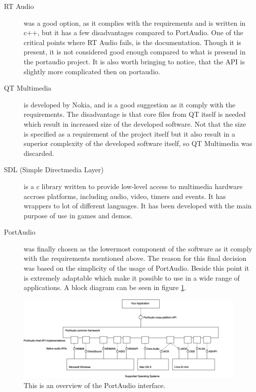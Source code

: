 \begin{description}
\item[RT Audio\footnotemark] was a good option, as it complies with the requirements and is written in c++, but it has a few disadvantages compared to PortAudio. One of the critical points where RT Audio fails, is the documentation. Though it is present, it is not considered good enough compared to what is presend in the portaudio project. It is also worth bringing to notice, that the API is slightly more complicated then on portaudio.

\item[QT Multimedia\footnotemark] is developed by Nokia, and is a good suggestion as it comply with the requirements. The disadvantage is that core files from QT itself is needed which result in increased size of the developed software. Not that the size is specified as a requirement of the project itself but it also result in a superior complexity of the developed software itself, so QT Multimedia was discarded.

\item[SDL (Simple Directmedia Layer)\footnotemark]
 is a c library written to provide low-level access to multimedia hardware accross platforms, including audio, video, timers and events. It has wrappers to lot of different languages. It has been developed with the main purpose of use in games and demos.

\item[PortAudio\footnotemark] was finally chosen as the lowermost component of the software as it comply with the requirements mentioned above.  The reason for this final decision was based on the simplicity of the usage of PortAudio. Beside this point it is extremely adaptable which make it possible to use in a wide range of applications. A block diagram can be seen in figure \ref{fig:app_portaudio}.
\end{description}

\begin{figure}[htb]
	\begin{center}
	\includegraphics[scale=0.44,trim=0 0 0 0]{content/graphics/appendix/portaudio_architecture.png}%
	\caption{This is an overview of the PortAudio interface.}
	\label{fig:app_portaudio}
	\end{center}
\end{figure}
